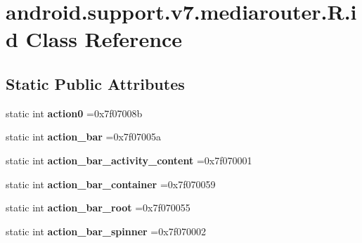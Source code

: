 \hypertarget{classandroid_1_1support_1_1v7_1_1mediarouter_1_1R_1_1id}{}\section{android.\+support.\+v7.\+mediarouter.\+R.\+id Class Reference}
\label{classandroid_1_1support_1_1v7_1_1mediarouter_1_1R_1_1id}
\subsection*{Static Public Attributes}
\begin{DoxyCompactItemize}
\item 
\mbox{\label{classandroid_1_1support_1_1v7_1_1mediarouter_1_1R_1_1id_aad345f727dcbd51280d611d48a5ed556}} 
static int {\bfseries action0} =0x7f07008b
\item 
\mbox{\label{classandroid_1_1support_1_1v7_1_1mediarouter_1_1R_1_1id_aa398978b3dd6377c6553b9cb506df66d}} 
static int {\bfseries action\+\_\+bar} =0x7f07005a
\item 
\mbox{\label{classandroid_1_1support_1_1v7_1_1mediarouter_1_1R_1_1id_aacd1522d862c2fe126e652de11eb2a90}} 
static int {\bfseries action\+\_\+bar\+\_\+activity\+\_\+content} =0x7f070001
\item 
\mbox{\label{classandroid_1_1support_1_1v7_1_1mediarouter_1_1R_1_1id_a34be0652d9c698b38b24435d9a3fd265}} 
static int {\bfseries action\+\_\+bar\+\_\+container} =0x7f070059
\item 
\mbox{\label{classandroid_1_1support_1_1v7_1_1mediarouter_1_1R_1_1id_ab61f7203d7e699f18a4e294758f21a96}} 
static int {\bfseries action\+\_\+bar\+\_\+root} =0x7f070055
\item 
\mbox{\label{classandroid_1_1support_1_1v7_1_1mediarouter_1_1R_1_1id_af760ad69480eba6b2cbd81a1cf0b4f28}} 
static int {\bfseries action\+\_\+bar\+\_\+spinner} =0x7f070002

\end{DoxyCompactItemize}
